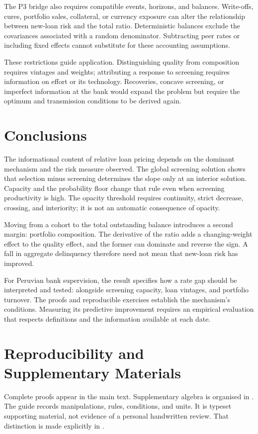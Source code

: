 \documentclass[11pt]{article}
\theoremstyle{definition}\newtheorem{assumption}{Assumption}
\begin{document}
The P3 bridge also requires compatible events, horizons, and balances.
Write-offs, cures, portfolio sales, collateral, or currency exposure can
alter the relationship between new-loan risk and the total ratio.
Deterministic balances exclude the covariances associated with a random
denominator. Subtracting peer rates or including fixed effects cannot
substitute for these accounting assumptions.

These restrictions guide application. Distinguishing quality from composition
requires vintages and weights; attributing a response to screening requires
information on effort or its technology. Recoveries, concave screening,
or imperfect information at the bank would expand the problem but require
the optimum and transmission conditions to be derived again.

\section{Conclusions}
The informational content of relative loan pricing depends on the dominant
mechanism and the risk measure observed. The global screening solution shows
that selection minus screening determines the slope only at an interior
solution. Capacity and the probability floor change that rule even when
screening productivity is high. The opacity threshold requires continuity,
strict decrease, crossing, and interiority; it is not an automatic consequence
of opacity.

Moving from a cohort to the total outstanding balance introduces a second
margin: portfolio composition. The derivative of the ratio adds a changing-weight
effect to the quality effect, and the former can dominate and reverse the
sign. A fall in aggregate delinquency therefore need not mean that new-loan
risk has improved.

For Peruvian bank supervision, the result specifies how a rate gap should
be interpreted and tested: alongside screening capacity, loan vintages,
and portfolio turnover. The proofs and reproducible exercises establish
the mechanism's conditions. Measuring its predictive improvement requires
an empirical evaluation that respects definitions and the information
available at each date.\label{body:end}
\clearpage

\clearpage\appendix

\section{Reproducibility and Supplementary Materials}
Complete proofs appear in the main text. Supplementary algebra is organised
in . The guide records manipulations,
rules, conditions, and units. It is typeset supporting material, not evidence
of a personal handwritten review. That distinction is made explicitly in
.
\end{document}
